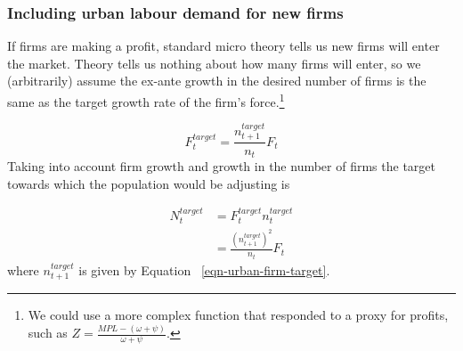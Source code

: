 


\subsubsection{Including  urban labour demand for new firms}
If firms are making a profit, standard micro theory tells us new firms will enter the market. %
Theory tells us nothing about how many firms will enter, %
so we (arbitrarily) assume the ex-ante growth in the desired number of firms is the same as the  target growth rate of the firm's  force.\footnote{We could use a more complex function that responded to a proxy for profits, such as $Z=\frac{MPL-(\omega+\psi)}{\omega+\psi}$.} 


 \begin{equation}
F_t^{target}= \frac{n^{target}_{t+1}}{n_{t}}F_t
\end{equation} 
Taking into account firm growth and growth in the number of firms the target towards which the population would be adjusting  is 

 \begin{align}
N_t^{target}&=F_t^{target}n_t^{target}\\
            &= \frac{(n^{target}_{t+1})^2}{n_{t}}F_t
\end{align} 
where $n^{target}_{t+1}$ is given by Equation ~\ref{eqn-urban-firm-target}.  


